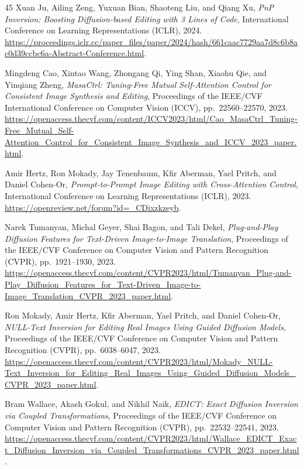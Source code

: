 \documentclass[conference]{IEEEtran}
\begin{document}
\begin{thebibliography}{45}
Xuan Ju, Ailing Zeng, Yuxuan Bian, Shaoteng Liu, and Qiang Xu,
\textit{PnP Inversion: Boosting Diffusion-based Editing with 3 Lines of Code},
International Conference on Learning Representations (ICLR), 2024.
\url{https://proceedings.iclr.cc/paper_files/paper/2024/hash/661caac7729aa7d8c6b8ac0d39ccbc6a-Abstract-Conference.html}.

Mingdeng Cao, Xintao Wang, Zhongang Qi, Ying Shan, Xiaohu Qie, and Yinqiang Zheng,
\textit{MasaCtrl: Tuning-Free Mutual Self-Attention Control for Consistent Image Synthesis and Editing},
Proceedings of the IEEE/CVF International Conference on Computer Vision (ICCV), pp.~22560--22570, 2023.
\url{https://openaccess.thecvf.com/content/ICCV2023/html/Cao_MasaCtrl_Tuning-Free_Mutual_Self-Attention_Control_for_Consistent_Image_Synthesis_and_ICCV_2023_paper.html}.

Amir Hertz, Ron Mokady, Jay Tenenbaum, Kfir Aberman, Yael Pritch, and Daniel Cohen-Or,
\textit{Prompt-to-Prompt Image Editing with Cross-Attention Control},
International Conference on Learning Representations (ICLR), 2023.
\url{https://openreview.net/forum?id=_CDixzkzeyb}.

Narek Tumanyan, Michal Geyer, Shai Bagon, and Tali Dekel,
\textit{Plug-and-Play Diffusion Features for Text-Driven Image-to-Image Translation},
Proceedings of the IEEE/CVF Conference on Computer Vision and Pattern Recognition (CVPR), pp.~1921--1930, 2023.
\url{https://openaccess.thecvf.com/content/CVPR2023/html/Tumanyan_Plug-and-Play_Diffusion_Features_for_Text-Driven_Image-to-Image_Translation_CVPR_2023_paper.html}.

Ron Mokady, Amir Hertz, Kfir Aberman, Yael Pritch, and Daniel Cohen-Or,
\textit{NULL-Text Inversion for Editing Real Images Using Guided Diffusion Models},
Proceedings of the IEEE/CVF Conference on Computer Vision and Pattern Recognition (CVPR), pp.~6038--6047, 2023.
\url{https://openaccess.thecvf.com/content/CVPR2023/html/Mokady_NULL-Text_Inversion_for_Editing_Real_Images_Using_Guided_Diffusion_Models_CVPR_2023_paper.html}.

Bram Wallace, Akash Gokul, and Nikhil Naik,
\textit{EDICT: Exact Diffusion Inversion via Coupled Transformations},
Proceedings of the IEEE/CVF Conference on Computer Vision and Pattern Recognition (CVPR), pp.~22532--22541, 2023.
\url{https://openaccess.thecvf.com/content/CVPR2023/html/Wallace_EDICT_Exact_Diffusion_Inversion_via_Coupled_Transformations_CVPR_2023_paper.html}.


\end{thebibliography}
\end{document}
